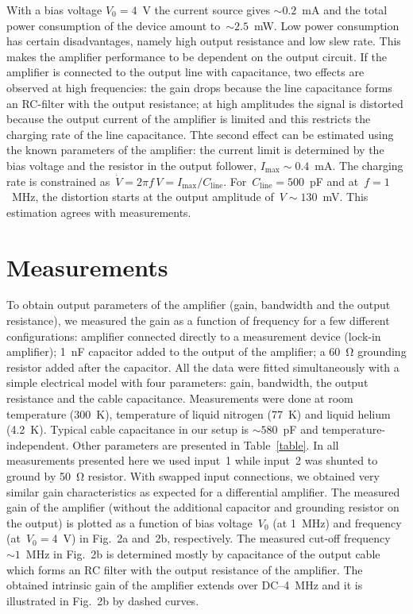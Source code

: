 \documentclass{twocol}
\begin{document}
With a bias voltage $V_0=4$~V the current source gives $\sim 0.2$~mA and
the total power consumption of the device amount to~$\sim 2.5$~mW. Low power
consumption has certain disadvantages, namely high output resistance and
low slew rate. This makes the amplifier performance to be dependent on
the output circuit. If the amplifier is connected to the
output line with capacitance, two effects are observed at high
frequencies: the gain drops because the line capacitance forms an RC-filter
with the output resistance; at high amplitudes the signal is distorted
because the output current of the amplifier is limited and this restricts
the charging rate of the line capacitance. Thte second effect can be estimated
using the known parameters of the amplifier: the current limit is determined by the bias
voltage and the resistor in the output follower, $I_{\mbox{max}} \sim
0.4$~mA. The charging rate is constrained as~$\dot V = 2\pi f\,V =
I_{\mbox{max}} / C_{\mbox{line}}$. For~$C_{\mbox{line}}=500$~pF
and at~$f=1$~MHz, the distortion starts at the output amplitude
of~$V\sim 130$~mV. This estimation agrees with measurements.


\section{Measurements}

To obtain output parameters of the amplifier (gain, bandwidth and the
output resistance), we measured the gain as a function of frequency for a
few different configurations: amplifier connected directly to a
measurement device (lock-in amplifier); 1~nF capacitor added to the
output of the amplifier; a 60~$\mathrm{\Omega}$ grounding resistor added after the
capacitor. All the data were fitted simultaneously with a simple
electrical model with four parameters: gain, bandwidth, the output
resistance and the cable capacitance. Measurements were done at room
temperature (300~K), temperature of liquid nitrogen (77~K) and liquid
helium (4.2~K). Typical cable capacitance in our setup is $\sim580$~pF
and temperature-independent. Other parameters are presented in Table~\ref{table}.
In all measurements presented here we used input~1 while input~2 was
shunted to ground by 50~$\mathrm{\Omega}$ resistor. With swapped input
connections, we obtained very similar gain characteristics as expected
for a differential amplifier. The measured gain of the amplifier (without
the additional capacitor and grounding resistor on the output) is plotted
as a function of bias voltage~$V_0$ (at 1~MHz) and frequency
(at~$V_0=4$~V) in Fig.~2a and~2b, respectively. The measured cut-off
frequency~$\sim 1$~MHz in Fig.~2b is determined mostly by capacitance of
the output cable which forms an RC filter with the output resistance of
the amplifier. The obtained intrinsic gain of the amplifier
extends over DC--4~MHz and it is illustrated in Fig.~2b by dashed curves.
\end{document}
